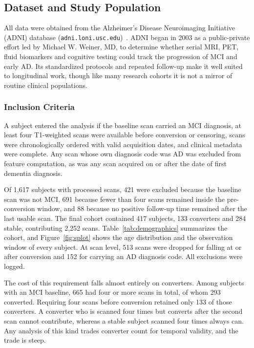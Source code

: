 \documentclass[blue]{ludusofficial}  %
\begin{document}
\subsection{Dataset and Study Population}

All data were obtained from the Alzheimer's Disease Neuroimaging Initiative (ADNI) database (\texttt{adni.loni.usc.edu})~\cite{weiner2010adni,petersen2010adni}. ADNI began in 2003 as a public-private effort led by Michael W. Weiner, MD, to determine whether serial MRI, PET, fluid biomarkers and cognitive testing could track the progression of MCI and early AD. Its standardized protocols and repeated follow-up make it well suited to longitudinal work, though like many research cohorts it is not a mirror of routine clinical populations.

\subsubsection{Inclusion Criteria}

A subject entered the analysis if the baseline scan carried an MCI diagnosis, at least four T1-weighted scans were available before conversion or censoring, scans were chronologically ordered with valid acquisition dates, and clinical metadata were complete. Any scan whose own diagnosis code was AD was excluded from feature computation, as was any scan acquired on or after the date of first dementia diagnosis.

Of 1,617 subjects with processed scans, 421 were excluded because the baseline scan was not MCI, 691 because fewer than four scans remained inside the pre-conversion window, and 88 because no positive follow-up time remained after the last usable scan. The final cohort contained 417 subjects, 133 converters and 284 stable, contributing 2,252 scans. Table~\ref{tab:demographics} summarizes the cohort, and Figure~\ref{fig:splot} shows the age distribution and the observation window of every subject. At scan level, 513 scans were dropped for falling at or after conversion and 152 for carrying an AD diagnosis code. All exclusions were logged.

The cost of this requirement falls almost entirely on converters. Among subjects with an MCI baseline, 665 had four or more scans in total, of whom 293 converted. Requiring four scans before conversion retained only 133 of those converters. A converter who is scanned four times but converts after the second scan cannot contribute, whereas a stable subject scanned four times always can. Any analysis of this kind trades converter count for temporal validity, and the trade is steep.
\end{document}

